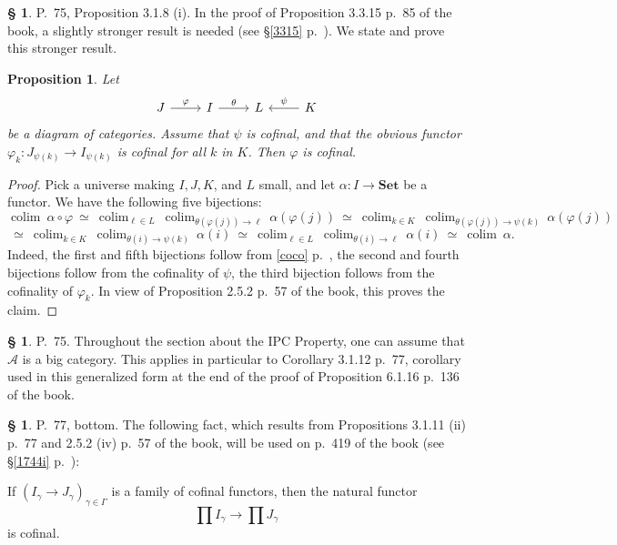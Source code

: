 \documentclass[12pt]{article}
\newtheorem{prop}[thm]{Proposition}
\theoremstyle{remark}
\theoremstyle{definition}
\newtheorem{s}[thm]{\S}
\newcommand{\A}{\mathcal A}
\newcommand{\Set}{\mathbf{Set}}
\newcommand{\pp}{\varphi}
\DeclareMathOperator*{\colim}{colim}
\begin{document}
\begin{s} 
P.~75, Proposition 3.1.8 (i). In the proof of Proposition 3.3.15 p.~85 of the book, a slightly stronger result is needed (see \S\ref{3315} p.~\pageref{3315}). We state and prove this stronger result. 
%
\begin{prop}\label{318i} 
%
Let 
$$
\begin{tikzcd}
J\ar{r}{\pp}&I\ar{r}{\theta}&L&K\ar{l}[swap]{\psi}
\end{tikzcd}
$$
be a diagram of categories. Assume that $\psi$ is cofinal, and that the obvious functor $\pp_k:J_{\psi(k)}\to I_{\psi(k)}$ is cofinal for all $k$ in $K$. Then $\pp$ is cofinal. 
%
\end{prop} 
%
\begin{proof}
Pick a universe making $I,J,K$, and $L$ small, and let $\alpha:I\to\Set$ be a functor. We have the following five bijections:
$$
\colim\ \alpha\circ\pp\ \simeq\ 
%
\colim_{\ell\in L}\ \colim_{\theta(\pp(j))\to\ell}\ \alpha(\pp(j))\ \simeq\ 
%
\colim_{k\in K}\ \colim_{\theta(\pp(j))\to\psi(k)}\ \alpha(\pp(j))
$$
$$
\ \simeq\ \colim_{k\in K}\ \colim_{\theta(i)\to\psi(k)}\ \alpha(i)\ \simeq\ 
%
\colim_{\ell\in L}\ \colim_{\theta(i)\to\ell}\ \alpha(i)\ \simeq\ 
%
\colim\ \alpha.
$$
Indeed, the first and fifth bijections follow from \eqref{coco} p.~\pageref{coco}, the second and fourth bijections follow from the cofinality of $\psi$, the third bijection follows from the cofinality of $\pp_k$. In view of Proposition 2.5.2 p.~57 of the book, this proves the claim.
\end{proof}
\end{s}

%

\begin{s}\label{cipc}
P.~75. Throughout the section about the IPC Property, one can assume that $\A$ is a big category. This applies in particular to Corollary 3.1.12 p.~77, corollary used in this generalized form at the end of the proof of Proposition 6.1.16 p.~136 of the book.
\end{s}

%

\begin{s}\label{poc}
P.~77, bottom. The following fact, which results from Propositions 3.1.11 (ii) p.~77 and 2.5.2 (iv) p.~57 of the book, will be used on p.~419 of the book (see \S\ref{1744i} p.~\pageref{1744i}):

If $(I_\gamma\to J_\gamma)_{\gamma\in\Gamma}$ is a family of cofinal functors, then the natural functor 
$$
\prod I_\gamma\to\prod J_\gamma
$$ 
is cofinal. 
\end{s}
\end{document}
